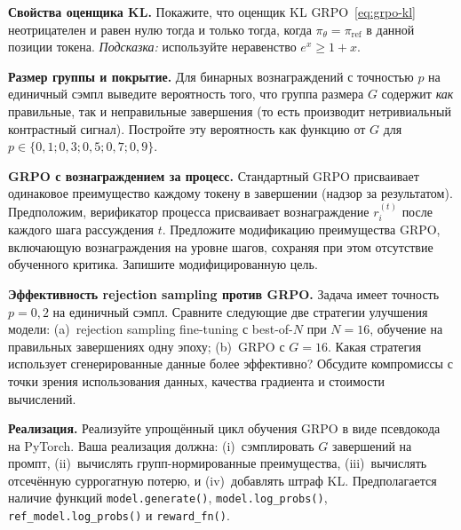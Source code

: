 \begin{exercise}
\label{ex:grpo-6}
\textbf{Свойства оценщика KL.} Покажите, что оценщик KL GRPO~\eqref{eq:grpo-kl} неотрицателен и равен нулю тогда и только тогда, когда $\pi_\theta = \pi_\mathrm{ref}$ в данной позиции токена. \emph{Подсказка:} используйте неравенство $e^x \geq 1 + x$.
\end{exercise}

\begin{exercise}
\label{ex:grpo-7}
\textbf{Размер группы и покрытие.} Для бинарных вознаграждений с точностью $p$ на единичный сэмпл выведите вероятность того, что группа размера $G$ содержит \emph{как} правильные, так и неправильные завершения (то есть производит нетривиальный контрастный сигнал). Постройте эту вероятность как функцию от $G$ для $p \in \{0{,}1; 0{,}3; 0{,}5; 0{,}7; 0{,}9\}$.
\end{exercise}

\begin{exercise}
\label{ex:grpo-8}
\textbf{GRPO с вознаграждением за процесс.} Стандартный GRPO присваивает одинаковое преимущество каждому токену в завершении (надзор за результатом). Предположим, верификатор процесса присваивает вознаграждение $r_i^{(t)}$ после каждого шага рассуждения $t$. Предложите модификацию преимущества GRPO, включающую вознаграждения на уровне шагов, сохраняя при этом отсутствие обученного критика. Запишите модифицированную цель.
\end{exercise}

\begin{exercise}
\label{ex:grpo-9}
\textbf{Эффективность rejection sampling против GRPO.} Задача имеет точность $p = 0{,}2$ на единичный сэмпл. Сравните следующие две стратегии улучшения модели: (a)~rejection sampling fine-tuning с best-of-$N$ при $N = 16$, обучение на правильных завершениях одну эпоху; (b)~GRPO с $G = 16$. Какая стратегия использует сгенерированные данные более эффективно? Обсудите компромиссы с точки зрения использования данных, качества градиента и стоимости вычислений.
\end{exercise}

\begin{exercise}
\label{ex:grpo-10}
\textbf{Реализация.} Реализуйте упрощённый цикл обучения GRPO в виде псевдокода на PyTorch. Ваша реализация должна: (i)~сэмплировать $G$ завершений на промпт, (ii)~вычислять групп-нормированные преимущества, (iii)~вычислять отсечённую суррогатную потерю, и (iv)~добавлять штраф KL. Предполагается наличие функций \texttt{model.generate()}, \texttt{model.log\_probs()}, \texttt{ref\_model.log\_probs()} и \texttt{reward\_fn()}.
\end{exercise}
